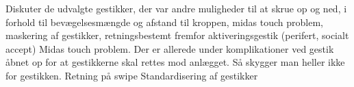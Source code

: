 Diskuter de udvalgte gestikker, der var andre muligheder til at skrue op og ned, i forhold til bevægelsesmængde og afstand til kroppen, midas touch problem, maskering af gestikker, retningsbestemt fremfor aktiveringsgestik (perifert, socialt accept)\blankline
%
Midas touch problem. Der er allerede under komplikationer ved gestik åbnet op for at gestikkerne skal rettes mod anlægget. Så skygger man heller ikke for gestikken.\blankline
%
Retning på swipe\blankline
%
Standardisering af gestikker
%

